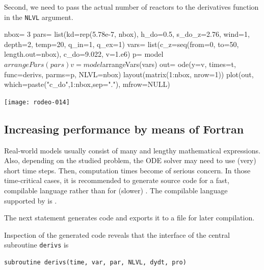 \documentclass[times,onecolumn]{article}
\begin{document}
Second, we need to pass the actual number of reactors to the derivatives function in the \verb!NLVL! argument.

\begin{Schunk}
\begin{Sinput}
 nbox= 3
 pars= list(kd=rep(5.78e-7, nbox), h_do=0.5, s_do_z=2.76, wind=1,
   depth=2, temp=20, q_in=1, q_ex=1)
 vars= list(c_z=seq(from=0, to=50, length.out=nbox), c_do=9.022,
   v=1.e6)
 p= model$arrangePars(pars)
 v= model$arrangeVars(vars)
 out= ode(y=v, times=t, func=derivs, parms=p, NLVL=nbox)
 layout(matrix(1:nbox, nrow=1))
 plot(out, which=paste("c_do",1:nbox,sep="."), mfrow=NULL)
\end{Sinput}
\end{Schunk}
\texttt{[image: rodeo-014]}


\subsection{Increasing performance by means of Fortran} \label{sec:advanced:fortran}

Real-world models usually consist of many and lengthy mathematical expressions. Also, depending on the studied problem, the ODE solver may need to use (very) short time steps. Then, computation times become of serious concern. In those time-critical cases, it is recommended to generate source code for a fast, compilable language rather than for (slower) . The compilable language supported by  is .

The next statement generates  code and exports it to a file for later compilation.

\begin{Schunk}
\end{Schunk}

Inspection of the generated  code reveals that the interface of the central subroutine \verb|derivs| is

\begin{verbatim}
subroutine derivs(time, var, par, NLVL, dydt, pro)
\end{verbatim}
\end{document}
